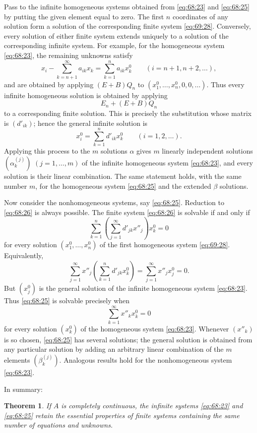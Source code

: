 \documentclass[
  paper=b5,
  fontsize=13pt,
  twoside=true,
  open=any,
  bookmarkpackage=false,
  chapterprefix=true,
  headings=normal
]{scrbook}
\newtheorem*{theorem}{Theorem}
\theoremstyle{definition}
\begin{document}
Pass to the infinite homogeneous systems obtained from
\eqref{eq:68:23} and \eqref{eq:68:25} by putting the given element equal
to zero. The first $n$ coordinates of any solution form a solution of the
corresponding finite system \eqref{eq:69:28}. Conversely, every solution
of either finite system extends uniquely to a solution of the corresponding
infinite system. For example, for the homogeneous system
\eqref{eq:68:23}, the remaining unknowns satisfy
\[
 x_i-\sum_{k=n+1}^{\infty}a_{ik}x_k
 =\sum_{k=1}^{n}a_{ik}x_k^0
 \qquad(i=n+1,n+2,\ldots),
\]
and are obtained by applying $(E+B)Q_n$ to
$(x_1^0,\ldots,x_n^0,0,0,\ldots)$. Thus every infinite homogeneous
solution is obtained by applying
\[
 E_n+(E+B)Q_n
\]
to a corresponding finite solution.
This is precisely the substitution whose matrix is $(d'_{ik})$; hence the
general infinite solution is
\[
 x_i^0=\sum_{k=1}^{n}d'_{ik}x_k^0
 \qquad(i=1,2,\ldots).
\]
Applying this process to the $m$ solutions $\alpha$ gives $m$ linearly
independent solutions $(\alpha_k^{(j)})$ $(j=1,\ldots,m)$ of the infinite
homogeneous system \eqref{eq:68:23}, and every solution is their linear
combination. The same statement holds, with the same number $m$, for the
homogeneous system \eqref{eq:68:25} and the extended $\beta$ solutions.

Now consider the nonhomogeneous systems, say \eqref{eq:68:25}. Reduction
to \eqref{eq:68:26} is always possible. The finite system
\eqref{eq:68:26} is solvable if and only if
\[
 \sum_{k=1}^{n}\left(\sum_{j=1}^{\infty}d'_{jk}x''_j\right)x_k^0=0
\]
for every solution $(x_1^0,\ldots,x_n^0)$ of the first homogeneous system
\eqref{eq:69:28}. Equivalently,
\[
 \sum_{j=1}^{\infty}x''_j
   \left(\sum_{k=1}^{n}d'_{jk}x_k^0\right)
 =\sum_{j=1}^{\infty}x''_j x_j^0=0.
\]
But $(x_j^0)$ is the general solution of the infinite homogeneous system
\eqref{eq:68:23}. Thus \eqref{eq:68:25} is solvable precisely when
\[
  \sum_{k=1}^{\infty}x''_k x_k^0=0
\]
for every solution $(x_k^0)$ of the homogeneous system
\eqref{eq:68:23}.
Whenever $(x''_k)$ is so chosen, \eqref{eq:68:25} has several solutions;
the general solution is obtained from any particular solution by adding an
arbitrary linear combination of the $m$ elements $(\beta_k^{(j)})$.
Analogous results hold for the nonhomogeneous system \eqref{eq:68:23}.

In summary:
\begin{theorem}
If $A$ is completely continuous, the infinite systems
\eqref{eq:68:23} and \eqref{eq:68:25} retain the essential properties of
finite systems containing the same number of equations and unknowns.
\end{theorem}
\end{document}
